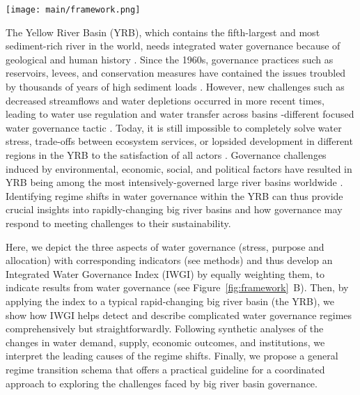 \documentclass[draft]{../agujournal2019}
\begin{document}
\begin{figure*}[!ht]
	\centering
	\texttt{[image: main/framework.png]}
	\caption{
		Identifying the water governance regimes in transitions of a hydrosocial cycle with an integrated water governance index (IWGI). Water stress (S), purposes of water services (P), and water allocation (A) are three aspects to be considered (\textbf{A.}). Along with hydrosocial-cycle transitions, a human-dominated regime influences these aspects of water governance. For example, the construction of reservoirs (1) aims to alleviate water stress; growth of energy and industry (2); water-lead intensive agriculture (3); conveyance system (4) controls water allocation.
		Therefore, the methodology is to combine three aspects' corresponding indicators, and then an abrupt change of the IWGI can indicate a regime shift in water governance (\textbf{B.}).
	}
	\label{fig:framework}
\end{figure*}


The Yellow River Basin (YRB), which contains the fifth-largest and most sediment-rich river in the world, needs integrated water governance because of geological and human history
\cite{mostern2021,best2019}.
Since the 1960s, governance practices such as reservoirs, levees, and conservation measures have contained the issues troubled by thousands of years of high sediment loads
\cite{wang2016e,song2020a}.
However, new challenges such as decreased streamflows and water depletions occurred in more recent times, leading to water use regulation and water transfer across basins -different focused water governance tactic
\cite{wang2019c}.
Today, it is still impossible to completely solve water stress, trade-offs between ecosystem services, or lopsided development in different regions in the YRB to the satisfaction of all actors
\cite{wohlfart2016a}.
Governance challenges induced by environmental, economic, social, and political factors have resulted in YRB being among the most intensively-governed large river basins worldwide \cite{nickum2021}.
Identifying regime shifts in water governance within the YRB can thus provide crucial insights into rapidly-changing big river basins and how governance may respond to meeting challenges to their sustainability.

Here, we depict the three aspects of water governance (stress, purpose and allocation) with corresponding indicators (see methods) and thus develop an Integrated Water Governance Index (IWGI) by equally weighting them, to indicate results from water governance (see Figure~\ref{fig:framework}~B).
Then, by applying the index to a typical rapid-changing big river basin (the YRB), we show how IWGI helps detect and describe complicated water governance regimes comprehensively but straightforwardly.
Following synthetic analyses of the changes in water demand, supply, economic outcomes, and institutions, we interpret the leading causes of the regime shifts.
Finally, we propose a general regime transition schema that offers a practical guideline for a coordinated approach to exploring the challenges faced by big river basin governance.
\end{document}
